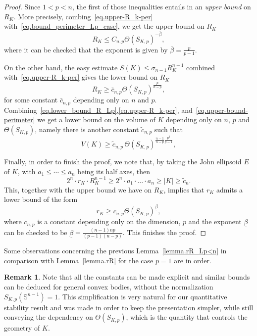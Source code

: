 \documentclass[a4paper, 10pt, twoside]{amsart}
\numberwithin{equation}{section}
\newcommand{\remkname}{Remark}
\theoremstyle{plain}
\theoremstyle{definition}
\newtheorem{remark}[theorem]{\remkname}
\begin{document}
\begin{proof}
Since $1 <p < n$, the first of those inequalities entails in an \emph{upper bound} on $R_K$. More precisely, combing~\eqref{eq.upper-R_k-per} with~\eqref{eq.bound_perimeter_Lp_case}, we get the upper bound on $R_K$ 
\begin{equation}
    R_K 
    \le 
    C_{n,p}
    \Theta(S_{K,p})^{-\overline{\beta}},
\end{equation}
where it can be checked that the exponent is given by $\overline{\beta} = \frac{p}{p-1}$. 

On the other hand, the easy estimate $S(K) \le \sigma_{n-1} R_K^{n-1}$ combined with~\eqref{eq.upper-R_k-per} gives the lower bound on $R_K$
\begin{equation}\label{eq.lower_bound_R_Lp}
    R_K \ge
    \bar c_{n,p}
    \Theta(S_{K,p})^{\frac{p}{n-p}},
\end{equation}
for some constant $\bar c_{n,p}$ depending only on $n$ and $p$. Combining~\eqref{eq.lower_bound_R_Lp},\eqref{eq.upper-R_k-per}, and~\eqref{eq.upper-bound-perimeter} we get a lower bound on the volume of $K$ depending only on $n$, $p$ and $\Theta(S_{K,p})$, namely there is another constant $\tilde{c}_{n,p}$ such that
\begin{equation}
    V(K) \ge 
    \tilde{c}_{n,p}\, \Theta(S_{K,p})^{\frac{n-1}{n-p}\frac{p^2}{p-1}},
\end{equation}

Finally, in order to finish the proof, we note that, by taking the John ellipsoid  $E$ of $K$, with $a_1 \le \cdots \le a_n$ being its half axes, then 
\[
    2^n \cdot r_K \cdot R_K^{n-1} \ge 2^n \cdot a_1 \cdot \dots \cdot a_n \ge |K| \ge \tilde{c}_n. 
\]
This, together with the upper bound we have on $R_K$, implies that $r_K$ admits a lower bound of the form 
\[
    r_K \ge c_{n,p} \Theta(S_{K,p})^{\underline{\beta}},
\]
where $c_{n,p}$ is a constant depending only on the dimension, $p$ and the exponent $\underline{\beta}$ can be checked to be $\underline{\beta} = \frac{(n-1)np}{(p-1)(n-p)}$. This finishes the proof. 
\end{proof}

Some observations concerning the previous Lemma~\ref{lemma.rR_Lp<n} in comparison with Lemma~\ref{lemma.rR} for the case $p=1$ are in order.

\begin{remark}
    Note that all the constants can be made explicit and similar bounds can be deduced for general convex bodies, without the normalization $S_{K,p}(\mathbb{S}^{n-1}) = 1$. This simplification is very natural for our quantitative stability result and was made in order to keep the presentation simpler, while still conveying the dependency on $\Theta(S_{K,p})$, which is the quantity that 
    controls the geometry of $K$. 
\end{remark}
\end{document}
